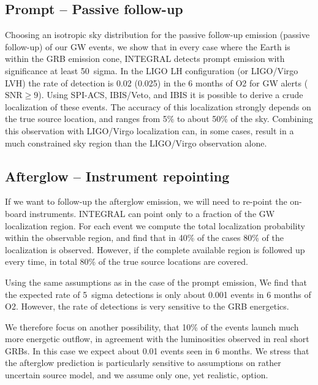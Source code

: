 \documentclass[11pt]{article}
\begin{document}
\subsection*{Prompt -- Passive follow-up}

Choosing an isotropic sky distribution for the passive follow-up
emission (passive follow-up) of our GW events, we show that in every
case where the Earth is within the GRB emission cone, INTEGRAL detects
prompt emission with significance at least 50~sigma. In the LIGO LH
configuration (or LIGO/Virgo LVH) the rate of detection is 0.02
(0.025) in the 6 months of O2 for GW alerts ($\mathrm{SNR} \geq
9$). Using SPI-ACS, IBIS/Veto, and IBIS it is possible to derive a
crude localization of these events. The accuracy of this localization
strongly depends on the true source location, and ranges from 5\% to
about 50\% of the sky. Combining this observation with LIGO/Virgo
localization can, in some cases, result in a much constrained sky
region than the LIGO/Virgo observation alone.

\subsection*{Afterglow -- Instrument repointing}

If we want to follow-up the afterglow emission, we will need to re-point the
on-board instruments. INTEGRAL can point only to a fraction of the GW
localization region. For each event we compute the total localization
probability within the observable region, and find that in 40\% of the cases
80\% of the localization is observed. However, if the complete available region
is followed up every time, in total 80\% of the true source locations are
covered.

Using the same assumptions as in the case of the prompt emission, We find that
the expected rate of 5~sigma detections is only about 0.001 events in 6 months
of O2. However, the rate of detections is very sensitive to the GRB energetics.

We therefore focus on another possibility, that 10\% of the events launch much
more energetic outflow, in agreement with the luminosities observed in real
short GRBs. In this case we expect about 0.01 events seen in 6 months. We
stress that the afterglow prediction is particularly sensitive to assumptions on
rather uncertain source model, and we assume only one, yet realistic, option.

\end{document}
